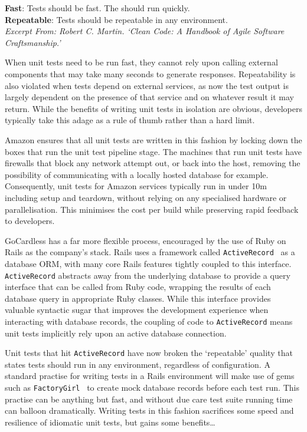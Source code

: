 \documentclass[11pt]{article}
\begin{document}
\begin{displayquote}

  \textbf{Fast}: Tests should be fast. The should run quickly. \\
  \textbf{Repeatable}: Tests should be repeatable in any environment. \\

  \textit{Excerpt From: Robert C. Martin. `Clean Code: A Handbook of Agile
  Software Craftsmanship.'}

\end{displayquote}

When unit tests need to be run fast, they cannot rely upon calling external
components that may take many seconds to generate responses. Repeatability is
also violated when tests depend on external services, as now the test output is
largely dependent on the presence of that service and on whatever result it may
return. While the benefits of writing unit tests in isolation are obvious,
developers typically take this adage as a rule of thumb rather than a hard
limit.

Amazon ensures that all unit tests are written in this fashion by locking down
the boxes that run the unit test pipeline stage. The machines that run unit
tests have firewalls that block any network attempt out, or back into the host,
removing the possibility of communicating with a locally hosted database for
example. Consequently, unit tests for Amazon services typically run in under 10m
including setup and teardown, without relying on any specialised hardware or
parallelisation. This minimises the cost per build while preserving rapid
feedback to developers.

GoCardless has a far more flexible process, encouraged by the use of Ruby on
Rails as the company's stack. Rails uses a framework called
\texttt{ActiveRecord}~\cite{activeRecord} as a database ORM, with many core
Rails features tightly coupled to this interface. \texttt{ActiveRecord}
abstracts away from the underlying database to provide a query interface that
can be called from Ruby code, wrapping the results of each database query in
appropriate Ruby classes.  While this interface provides valuable syntactic
sugar that improves the development experience when interacting with database
records, the coupling of code to \texttt{ActiveRecord} means unit tests
implicitly rely upon an active database connection.

Unit tests that hit \texttt{ActiveRecord} have now broken the `repeatable' quality that
states tests should run in any environment, regardless of configuration. A
standard practise for writing tests in a Rails environment will make use of gems
such as \texttt{FactoryGirl}~\cite{factoryGirl} to create mock database records
before each test run. This practise can be anything but fast, and without due
care test suite running time can balloon dramatically. Writing tests in this
fashion sacrifices some speed and resilience of idiomatic unit tests, but gains
some benefits\dots
\end{document}
